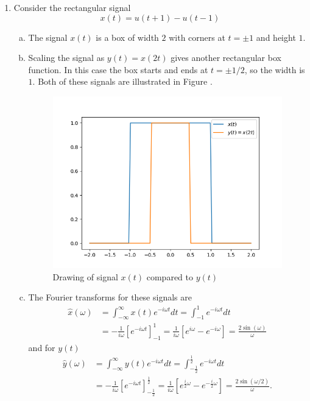 \newpage
\begin{enumerate}
\item Consider the rectangular signal 
$$x(t)=u(t+1)-u(t-1)$$

\begin{enumerate}[a)]
\item The signal $x(t)$ is a box of width $2$ with corners at $t=\pm 1$ and height $1$. 

\item Scaling the signal as $y(t)=x(2t)$ gives another rectangular box function. In this case the box starts and ends at $t=\pm 1/2$, so the width is $1$. Both of these signals are illustrated in Figure .

\begin{figure}
    \centering
    \includegraphics{ch08/figures/fig:ex8.1a.png}
    \caption{Drawing of signal $x(t)$ compared to $y(t)$}
    \label{fig:ex8.1a}
\end{figure}

\item The Fourier transforms for these signals are
\begin{align*}
    \hat{x}(\omega)&=\int_{-\infty}^{\infty}x(t)e^{-i\omega t}dt=\int_{-1}^{1}e^{-i\omega t}dt  \\
    &=-\frac{1}{i\omega}[e^{-i\omega t}]_{-1}^{1}=\frac{1}{i\omega}\left[e^{i\omega}-e^{-i\omega}\right]=\frac{2\sin(\omega)}{\omega}
\end{align*}
and for $y(t)$
\begin{align*}
    \hat{y}(\omega)&=\int_{-\infty}^{\infty}y(t)e^{-i\omega t}dt=\int_{-\frac{1}{2}}^{\frac{1}{2}}e^{-i\omega t}dt  \\
    &=-\frac{1}{i\omega}[e^{-i\omega t}]_{-\frac{1}{2}}^{\frac{1}{2}}=\frac{1}{i\omega}\left[e^{\frac{i}{2}\omega}-e^{-\frac{i}{2}\omega}\right]=\frac{2\sin(\omega/2)}{\omega}.
\end{align*}


\end{enumerate}
\end{enumerate}
